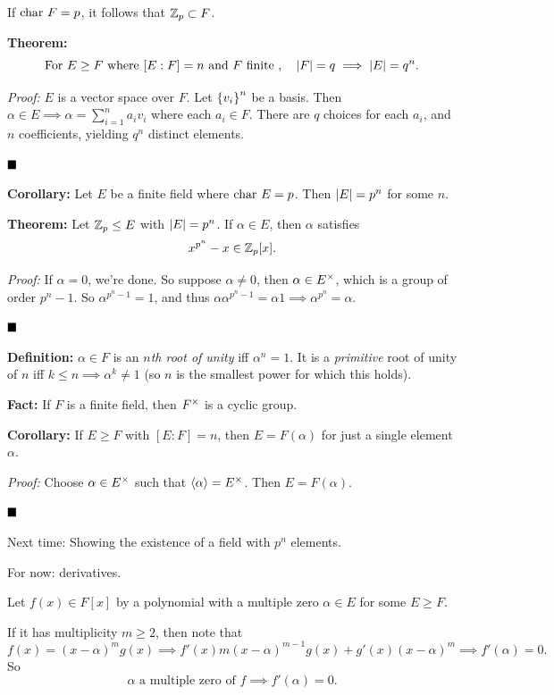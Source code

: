 If \(\mathrm{char}~ F = p\), it follows that \({\mathbb{Z}}_p \subset F\).

\textbf{Theorem:} \[
\text{For } E \geq F \text{ where } [E: F] = n \text{ and } F \text{ finite }, \quad
{\left\lvert {F} \right\rvert} = q \implies {\left\lvert {E} \right\rvert} = q^n
.\]

\emph{Proof:} \(E\) is a vector space over \(F\). Let \(\left\{{v_i}\right\}^n\)
be a basis. Then \(\alpha \in E \implies \alpha = \sum_{i=1}^n a_i v_i\)
where each \(a_i \in F\). There are \(q\) choices for each \(a_i\), and
\(n\) coefficients, yielding \(q^n\) distinct elements.

\(\qed\)

\textbf{Corollary:} Let \(E\) be a finite field where \(\mathrm{char}~ E = p\).
Then \({\left\lvert {E} \right\rvert} = p^n\) for some \(n\).

\textbf{Theorem:} Let \({\mathbb{Z}}_p \leq E\) with \({\left\lvert {E} \right\rvert} = p^n\). If
\(\alpha \in E\), then \(\alpha\) satisfies \[
x^{p^n} - x \in {\mathbb{Z}}_p[x].
\]

\emph{Proof:} If \(\alpha = 0\), we're done. So suppose
\(\alpha \neq 0\), then \(\alpha \in E^{\times}\), which is a group of
order \(p^n - 1\). So \(\alpha^{p^n - 1} = 1\), and thus
\(\alpha \alpha^{p^n - 1} = \alpha 1 \implies \alpha^{p^n} = \alpha\).

\(\qed\)

\textbf{Definition:} \(\alpha \in F\) is an \emph{\(n\)th root of unity}
iff \(\alpha^n = 1\). It is a \emph{primitive} root of unity of \(n\)
iff \(k\leq n \implies \alpha^k \neq 1\) (so \(n\) is the smallest power
for which this holds).

\textbf{Fact:} If \(F\) is a finite field, then \(F^{\times}\) is a cyclic
group.

\textbf{Corollary:} If \(E \geq F\) with \([E: F] = n\), then
\(E = F(\alpha)\) for just a single element \(\alpha\).

\emph{Proof:} Choose \(\alpha \in E^{\times}\) such that
\(\left\langle{\alpha}\right\rangle = E^{\times}\). Then \(E = F(\alpha)\).

\(\qed\)

Next time: Showing the existence of a field with \(p^n\) elements.

For now: derivatives.

Let \(f(x) \in F[x]\) by a polynomial with a multiple zero
\(\alpha \in E\) for some \(E \geq F\).

If it has multiplicity \(m \geq 2\), then note that \[
f(x) = (x-\alpha)^m g(x) \implies f'(x) m(x-\alpha)^{m-1}g(x) + g'(x)(x-\alpha)^m \implies f'(\alpha) = 0.
\] So \[
\alpha \text{ a multiple zero of } f \implies f'(\alpha) = 0
.\]

